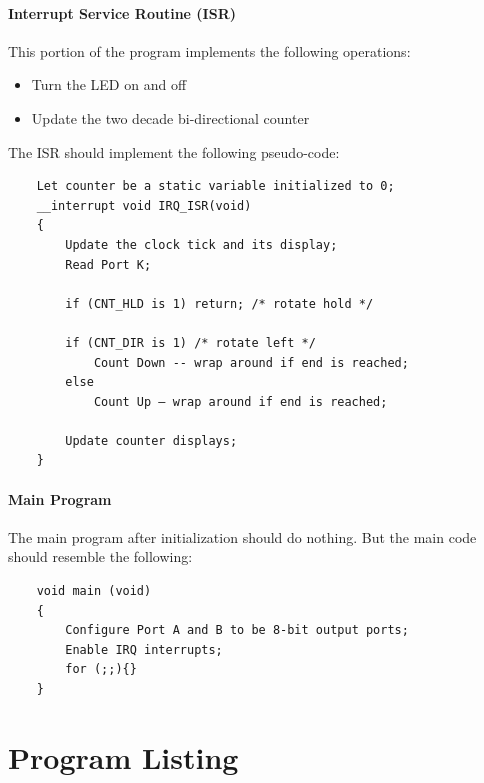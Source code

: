 \documentclass{article}
\begin{document}
	\paragraph{Interrupt Service Routine (ISR)}
	This portion of the program implements the following operations:
	\begin{itemize}
		\item Turn the LED on and off
		\item Update the two decade bi-directional counter
	\end{itemize}
	The ISR should implement the following pseudo-code:
	\begin{lstlisting}
	Let counter be a static variable initialized to 0;
	__interrupt void IRQ_ISR(void)
	{
		Update the clock tick and its display;
		Read Port K;
		
		if (CNT_HLD is 1) return; /* rotate hold */
		
		if (CNT_DIR is 1) /* rotate left */
			Count Down -- wrap around if end is reached;
		else
			Count Up – wrap around if end is reached;
		
		Update counter displays;
	}
	\end{lstlisting}
	\paragraph{Main Program}
	The main program after initialization should do nothing. But the main code should resemble the following:
	\begin{lstlisting}
	void main (void)
	{
		Configure Port A and B to be 8-bit output ports;
		Enable IRQ interrupts;
		for (;;){}
	}
	\end{lstlisting}
	\section*{Program Listing}
\end{document}
